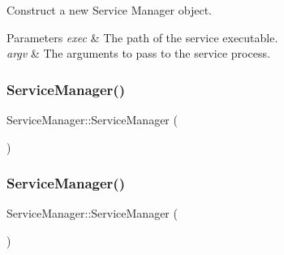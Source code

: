 Construct a new Service Manager object. 


\begin{DoxyParams}{Parameters}
{\em exec} & The path of the service executable. \\
\hline
{\em argv} & The arguments to pass to the service process. \\
\hline
\end{DoxyParams}
\mbox{\label{classServiceManager_a31781207d85e0db3dd96757c9faf619d}} 
\subsubsection{\texorpdfstring{Service\+Manager()}{ServiceManager()}\hspace{0.1cm}{\footnotesize\ttfamily [2/3]}}
{\footnotesize\ttfamily Service\+Manager\+::\+Service\+Manager (\begin{DoxyParamCaption}\item[{\hyperlink{classServiceManager}{Service\+Manager} const \&}]{ }\end{DoxyParamCaption})\hspace{0.3cm}{\ttfamily [delete]}}

\mbox{\label{classServiceManager_a019107c8c06276720e732f40b0d8847a}} 
\subsubsection{\texorpdfstring{Service\+Manager()}{ServiceManager()}\hspace{0.1cm}{\footnotesize\ttfamily [3/3]}}
{\footnotesize\ttfamily Service\+Manager\+::\+Service\+Manager (\begin{DoxyParamCaption}\item[{\hyperlink{classServiceManager}{Service\+Manager} \&\&}]{ }\end{DoxyParamCaption})\hspace{0.3cm}{\ttfamily [delete]}}

\mbox{\label{classServiceManager_a87b207df58ccd316320d490c003c7eda}} 
